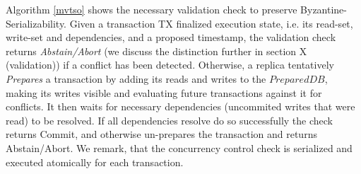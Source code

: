 Algorithm \ref{mvtso} shows the necessary validation check to preserve Byzantine-Serializability. 
Given a transaction TX finalized execution state, i.e. its read-set, write-set and dependencies, and a proposed timestamp, the validation check returns \textit{Abstain/Abort} (we discuss the distinction further in section X (validation)) if a conflict has been detected. Otherwise, a replica tentatively \textit{Prepares} a transaction by adding its reads and writes to the $PreparedDB$, making its writes visible and evaluating future transactions against it for conflicts. It then waits for necessary dependencies (uncommited writes that were read) to be resolved. 
If all dependencies resolve do so successfully the check returns Commit, and otherwise un-prepares the transaction and returns Abstain/Abort. We remark, that the concurrency control check is serialized and executed atomically for each transaction.

